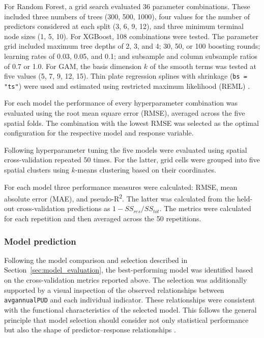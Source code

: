 \documentclass[11pt]{article}
\renewcommand{\_}{\textunderscore\allowbreak{}}
\begin{document}
For Random Forest, a grid search evaluated 36 parameter combinations. These included three numbers of trees (300, 500, 1000), four values for the number of predictors considered at each split (3, 6, 9, 12), and three minimum terminal node sizes (1, 5, 10). For XGBoost, 108 combinations were tested. The parameter grid included maximum tree depths of 2, 3, and 4; 30, 50, or 100 boosting rounds; learning rates of 0.03, 0.05, and 0.1; and subsample and column subsample ratios of 0.7 or 1.0. For GAM, the basis dimension $k$ of the smooth terms was tested at five values (5, 7, 9, 12, 15). Thin plate regression splines with shrinkage (\texttt{bs = "ts"}) were used and estimated using restricted maximum likelihood (REML) \citep{wood2025gam}.

For each model the performance of every hyperparameter combination was evaluated using the root mean square error (RMSE), averaged across the five spatial folds. The combination with the lowest RMSE was selected as the optimal configuration for the respective model and response variable.

Following hyperparameter tuning the five models were evaluated using spatial cross-validation repeated 50 times.  For the latter, grid cells were grouped into five spatial clusters using $k$-means clustering based on their coordinates.

For each model three performance measures were calculated: RMSE, mean absolute error (MAE), and pseudo-R\textsuperscript{2}. The latter was calculated from the held-out cross-validation predictions as $1 - SS_{res}/SS_{tot}$. The metrics were calculated for each repetition and then averaged across the 50 repetitions. 

\subsubsection{Model prediction}

Following the model comparison and selection described in Section~\ref{sec:model_evaluation}, the best-performing model was identified based on the cross-validation metrics reported above. The selection was additionally supported by a visual inspection of the observed relationships between \texttt{avg\_annual\_PUD} and each individual indicator. These relationships were consistent with the functional characteristics of the selected model. This follows the general principle that model selection should consider not only statistical performance but also the shape of predictor--response relationships \citep{guisan2000predictive}.
\end{document}
